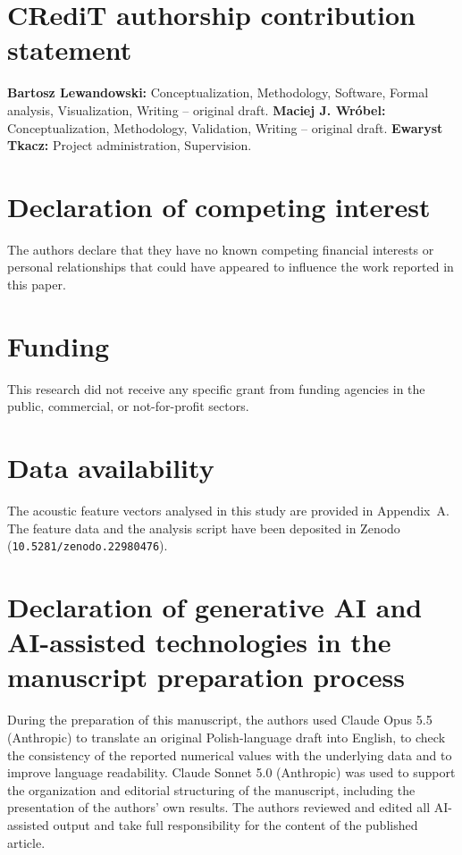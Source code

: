 
\section*{CRediT authorship contribution statement}
\textbf{Bartosz Lewandowski:} Conceptualization, Methodology, Software, Formal analysis, Visualization, Writing – original draft.
\textbf{Maciej J. Wróbel:} Conceptualization, Methodology, Validation, Writing – original draft.
\textbf{Ewaryst Tkacz:} Project administration, Supervision.

\section*{Declaration of competing interest}
The authors declare that they have no known competing financial interests or personal relationships that could have appeared to influence the work reported in this paper.

\section*{Funding}
This research did not receive any specific grant from funding agencies in the public, commercial, or not-for-profit sectors.

\section*{Data availability}
The acoustic feature vectors analysed in this study are provided in Appendix~A. The feature data and the analysis script have been deposited in  Zenodo (\texttt{10.5281/zenodo.22980476}).

\section*{Declaration of generative AI and AI-assisted technologies in the manuscript preparation process}

During the preparation of this manuscript, the authors used Claude Opus 5.5 (Anthropic) to translate an original Polish-language draft into English, to check the consistency of the reported numerical values with the underlying data and to improve language readability. Claude Sonnet 5.0 (Anthropic) was used to support the organization and editorial structuring of the manuscript, including the presentation of the authors' own results. The authors reviewed and edited all AI-assisted output and take full responsibility for the content of the published article.
